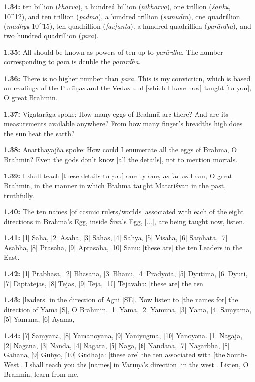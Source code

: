 \documentclass{article}
\newcommand{\vsnum}[1]{\textbf{#1}}
\newcommand{\skt}[1]{\textit{#1}}
\begin{document}
\vsnum{1.34: }ten billion (\skt{kharva}), a hundred billion (\skt{nikharva}), one trillion (\skt{śaṅku}, 10^12), and ten trillion (\skt{padma}), a hundred trillion (\skt{samudra}), one quadrillion (\skt{madhya} 10^15), ten quadrillion (\skt{[an]anta}), a hundred quadrillion (\skt{parārdha}), and two hundred quadrillion (\skt{para}).

\vsnum{1.35: }All should be known as powers of ten up to \skt{parārdha}. The number corresponding to \skt{para} is double the \skt{parārdha}.

\vsnum{1.36: }There is no higher number than \skt{para}. This is my conviction, which is based on readings of the Purāṇas and the Vedas and [which I have now] taught [to you], O great Brahmin.

\vsnum{1.37: }Vigatarāga spoke: How many eggs of Brahmā are there? And are its measurements available anywhere? From how many finger's breadths high does the sun heat the earth?

\vsnum{1.38: }Anarthayajña spoke: How could I enumerate all the eggs of Brahmā, O Brahmin? Even the gods don't know [all the details], not to mention mortals.

\vsnum{1.39: }I shall teach [these details to you] one by one, as far as I can, O great Brahmin, in the manner in which Brahmā taught Mātariśvan in the past, truthfully.

\vsnum{1.40: }The ten names [of cosmic rulers/worlds] associated with each of the eight directions in Brahmā's Egg, inside Śiva's Egg, [...], are being taught now, listen.

\vsnum{1.41: }[1] Saha, [2] Asaha, [3] Sahas, [4] Sahya, [5] Visaha, [6] Saṃhata, [7] Asabhā, [8] Prasaha, [9] Aprasaha, [10] Sānu: [these are] the ten Leaders in the East.

\vsnum{1.42: }[1] Prabhāsa, [2] Bhāsana, [3] Bhānu, [4] Pradyota, [5] Dyutima, [6] Dyuti, [7] Dīptatejas, [8] Tejas, [9] Tejā, [10] Tejavaho: [these are] the ten

\vsnum{1.43: }[leaders] in the direction of Agni [SE]. Now listen to [the names for] the direction of Yama [S], O Brahmin. [1] Yama, [2] Yamunā, [3] Yāma, [4] Saṃyama, [5] Yamuna, [6] Ayama,

\vsnum{1.44: }[7] Saṃyana, [8] Yamanoyāna, [9] Yaniyugmā, [10] Yanoyana. [1] Nagaja, [2] Naganā, [3] Nanda, [4] Nagara, [5] Naga, [6] Nandana, [7] Nagarbha, [8] Gahana, [9] Guhyo, [10] Gūḍhaja: [these are] the ten associated with [the South-West]. I shall teach you the [names] in Varuṇa's direction [in the west]. Listen, O Brahmin, learn from me.
\end{document}
